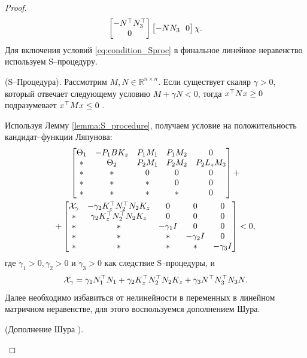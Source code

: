 \begin{proof}
\begin{align}
\begin{bmatrix}
			-{N}^\top{N}_3^\top \\ 0  
		\end{bmatrix}\begin{bmatrix}
			-{N}{N}_3 \ \ 0  
		\end{bmatrix} \chi.
	\end{align}
	Для включения условий \eqref{eq:condition_Sproc} в финальное линейное неравенство используем S--процедуру.
	\begin{lemma}\label{lemma:S_procedure}
		(S--Процедура).
		Рассмотрим ${M},{N} \in \mathbb{R}^{n\times n}$. Если существует скаляр $\gamma>0$, который отвечает следующему условию ${M}+\gamma {N}<0$, тогда $x^\top {N} x\geq 0$ подразумевает $x^\top{M}x\leq 0$ \cite{BOYED1994}.
	\end{lemma}
	Используя Лемму {\ref{lemma:S_procedure}}, получаем условие на положительность кандидат--функции Ляпунова:
	\begin{multline}
		\label{eq:after_S}
		\begin{bmatrix}
			{\Theta}_1 & -{P}_1{B}{K}_z & {P}_1{M}_1 & {P}_1{M}_2 &0 \\
			* &    {\Theta}_2 & {P}_2{M}_1 & {P}_2{M}_2 & {P}_2{L}_z{M}_3\\
			* & * & 0 & 0&0\\
			* & * & * & 0&0 \\
			* & * & * & *&0
		\end{bmatrix} + \\
		+
		\begin{bmatrix}
			\mathcal{X}_{\gamma}& -\gamma_2{K}_z^\top{N}_2^\top{N}_2{K}_z &0 &0 & 0\\
			*&\gamma_2{K}_z^\top{N}_2^\top{N}_2{K}_z&0&0&0\\
			*&*&-\gamma_1{I}&0&0\\
			*&*&*&-\gamma_2{I}&0\\
			*&*&*&*&-\gamma_3{I}\\
		\end{bmatrix} 
		<0,
	\end{multline}
	где $\gamma_1 > 0,\gamma_2 > 0$ и $\gamma_3 > 0$ как следствие S--процедуры, и
	\begin{equation}
		\mathcal{X}_{\gamma}=    \gamma_1{N}_1^\top{N}_1 +\gamma_2{K}_z^\top{N}_2^\top{N}_2{K}_z+\gamma_3{N}^\top{N}_3^\top{N}_3{N}.
	\end{equation}
	Далее необходимо избавиться от нелинейности в переменных в линейном матричном неравенстве, для этого воспользуемся дополнением Шура.
	\begin{lemma}\label{lemma:Schur}
		(Дополнение Шура \cite{Schur}).

\end{lemma}
\end{proof}
